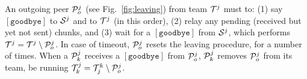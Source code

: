 \begin{figure*}
  \caption{Peer leaving.\label{fig:leaving}}
\end{figure*}
An outgoing peer ${\cal P}^j_o$ (see Fig.~\ref{fig:leaving}) from team
${\cal T}^j$ must to: (1) say $[\mathtt{goodbye}]$ to ${\cal S}^j$ and
to ${\cal T}^j$
(in this order), (2) relay any pending (received but yet not sent)
chunks, and (3) wait for a $[\mathtt{goodbye}]$ from ${\cal S}^j$,
which performs ${\cal T}^j = {\cal T}^j \setminus {\cal P}^j_o$. In
case of timeout, ${\cal P}^j_o$ resets the leaving procedure, for a
number of times. When a ${\cal P}^j_k$
receives a
$[\mathtt{goodbye}]$ from ${\cal P}^j_o$, ${\cal P}^j_k$ removes
${\cal P}^j_o$ from its team, be running ${\cal T}^j_k = {\cal T}^k_j \setminus {\cal P}^j_o$.

\begin{comment}
calls the Procedure \emph{Joining a
  team} (for $K=1$), to find a new neighbor. Finally, ${\cal S}_j$
sends to ${\cal P}_o$ a $[\mathtt{goodbye}]$ and performs ${\cal T}_j
= {\cal T}_j \setminus \{{\cal P}_o\}$.
\end{comment}

